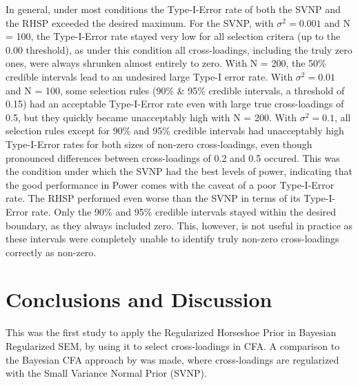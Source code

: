 \documentclass[]{interact}
\theoremstyle{plain}%
\theoremstyle{definition}
\theoremstyle{remark}
\begin{document}
In general, under most conditions the Type-I-Error rate of both the SVNP
and the RHSP exceeded the desired maximum. For the SVNP, with
\(\sigma^2 = 0.001\) and N = 100, the Type-I-Error rate stayed very low
for all selection critera (up to the 0.00 threshold), as under this
condition all cross-loadings, including the truly zero ones, were always
shrunken almost entirely to zero. With N = 200, the 50\% credible
intervals lead to an undesired large Type-I error rate. With
\(\sigma^2 = 0.01\) and N = 100, some selection rules (90\% \& 95\%
credible intervals, a threshold of 0.15) had an acceptable Type-I-Error
rate even with large true cross-loadings of 0.5, but they quickly became
unacceptably high with N = 200. With \(\sigma^2 = 0.1\), all selection
rules except for 90\% and 95\% credible intervals had unacceptably high
Type-I-Error rates for both sizes of non-zero cross-loadings, even
though pronounced differences between cross-loadings of 0.2 and 0.5
occured. This was the condition under which the SVNP had the best levels
of power, indicating that the good performance in Power comes with the
caveat of a poor Type-I-Error rate. The RHSP performed even worse than
the SVNP in terms of its Type-I-Error rate. Only the 90\% and 95\%
credible intervals stayed within the desired boundary, as they always
included zero. This, however, is not useful in practice as these
intervals were completely unable to identify truly non-zero
cross-loadings correctly as non-zero.

\hypertarget{conclusions-and-discussion}{%
\section{Conclusions and Discussion}\label{conclusions-and-discussion}}

This was the first study to apply the Regularized Horseshoe Prior
\citep[RHSP,][]{piironen_sparsity_2017} in Bayesian Regularized SEM, by
using it to select cross-loadings in CFA. A comparison to the Bayesian
CFA approach by \citet{muthen_bayesian_2012} was made, where
cross-loadings are regularized with the Small Variance Normal Prior
(SVNP).
\end{document}

